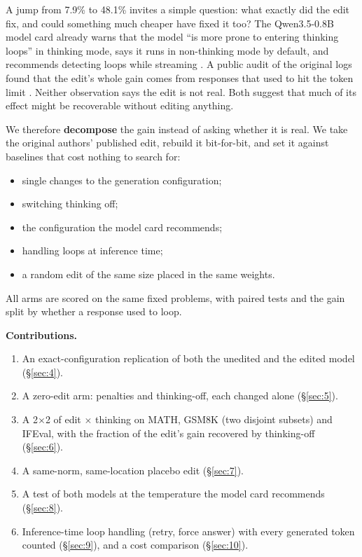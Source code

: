\documentclass[11pt]{article}
\begin{document}
A jump from 7.9\% to 48.1\% invites a simple question: what exactly did the edit fix, and could something much cheaper have fixed it too? The Qwen3.5-0.8B model card already warns that the model ``is more prone to entering thinking loops'' in thinking mode, says it runs in non-thinking mode by default, and recommends detecting loops while streaming \citep{qwen2026}. A public audit of the original logs found that the edit's whole gain comes from responses that used to hit the token limit \citep{messing2026}. Neither observation says the edit is not real. Both suggest that much of its effect might be recoverable without editing anything.

We therefore \textbf{decompose} the gain instead of asking whether it is real. We take the original authors' published edit, rebuild it bit-for-bit, and set it against baselines that cost nothing to search for:

\begin{itemize}[nosep,leftmargin=*]
\item single changes to the generation configuration;
\item switching thinking off;
\item the configuration the model card recommends;
\item handling loops at inference time;
\item a random edit of the same size placed in the same weights.
\end{itemize}

All arms are scored on the same fixed problems, with paired tests and the gain split by whether a response used to loop.

\textbf{Contributions.}

\begin{enumerate}[nosep,leftmargin=*]
\item An exact-configuration replication of both the unedited and the edited model (\S\ref{sec:4}).
\item A zero-edit arm: penalties and thinking-off, each changed alone (\S\ref{sec:5}).
\item A 2$\times$2 of edit $\times$ thinking on MATH, GSM8K (two disjoint subsets) and IFEval, with the fraction of the edit's gain recovered by thinking-off (\S\ref{sec:6}).
\item A same-norm, same-location placebo edit (\S\ref{sec:7}).
\item A test of both models at the temperature the model card recommends (\S\ref{sec:8}).
\item Inference-time loop handling (retry, force answer) with every generated token counted (\S\ref{sec:9}), and a cost comparison (\S\ref{sec:10}).
\end{enumerate}
\end{document}

